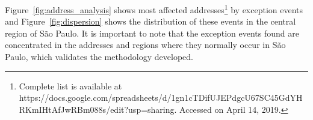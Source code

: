 \documentclass[runningheads]{llncs}
\begin{document}

Figure~\ref{fig:address_analysis} shows most affected addresses\footnote{Complete list is available at https://docs.google.com/spreadsheets/d/\newline1gn1cTDifUJEPdgcU67SC45GdYHRKmIHtAfJwRBm088s/edit?usp=sharing. Accessed on April 14, 2019.} by exception events and Figure~\ref{fig:dispersion} shows the distribution of these events in the central region of São Paulo. It is important to note that the exception events found are concentrated in the addresses and regions where they normally occur in São Paulo, which validates the methodology developed.
\end{document}
